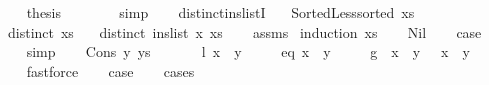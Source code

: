\begin{isabellebody}
\ \ \ \ \isamarkupfalse%
\ {\isacharquery}{\kern0pt}thesis\isanewline
\ \ \ \ \ \ \isamarkupfalse%
\ simp\isanewline
\ \ \isamarkupfalse%
\isanewline
{}\isamarkupfalse%
%
\endisatagproof
{\isafoldproof}%
%
\isadelimproof
\isanewline
%
\endisadelimproof
%
\isadeliminvisible
\isanewline
%
\endisadeliminvisible
%
\isataginvisible
{}\isamarkupfalse%
\ distinct{\isacharunderscore}{\kern0pt}ins{\isacharunderscore}{\kern0pt}listI{\isacharcolon}{\kern0pt}\isanewline
\ \ \ {\isachardoublequoteopen}Sorted{\isacharunderscore}{\kern0pt}Less{\isachardot}{\kern0pt}sorted\ xs{\isachardoublequoteclose}\isanewline
\ \ \ {\isachardoublequoteopen}distinct\ xs{\isachardoublequoteclose}\isanewline
\ \ \ {\isachardoublequoteopen}distinct\ {\isacharparenleft}{\kern0pt}ins{\isacharunderscore}{\kern0pt}list\ x\ xs{\isacharparenright}{\kern0pt}{\isachardoublequoteclose}%
\endisataginvisible
{\isafoldinvisible}%
%
\isadeliminvisible
\isanewline
%
\endisadeliminvisible
%
\isadelimproof
\ \ %
\endisadelimproof
%
\isatagproof
{}\isamarkupfalse%
\ assms\isanewline
{}\isamarkupfalse%
\ {\isacharparenleft}{\kern0pt}induction\ xs{\isacharparenright}{\kern0pt}\isanewline
\ \ \isamarkupfalse%
\ Nil\isanewline
\ \ \isamarkupfalse%
\ {\isacharquery}{\kern0pt}case\isanewline
\ \ \ \ \isamarkupfalse%
\ simp\isanewline
{}\isamarkupfalse%
\isanewline
\ \ \isamarkupfalse%
\ {\isacharparenleft}{\kern0pt}Cons\ y\ ys{\isacharparenright}{\kern0pt}\isanewline
\ \ \isamarkupfalse%
\isanewline
\ \ \ \ {\isacharparenleft}{\kern0pt}l{\isacharparenright}{\kern0pt}\ {\isachardoublequoteopen}x\ {\isacharless}{\kern0pt}\ y{\isachardoublequoteclose}\ {\isacharbar}{\kern0pt}\isanewline
\ \ \ \ {\isacharparenleft}{\kern0pt}eq{\isacharparenright}{\kern0pt}\ {\isachardoublequoteopen}x\ {\isacharequal}{\kern0pt}\ y{\isachardoublequoteclose}\ {\isacharbar}{\kern0pt}\isanewline
\ \ \ \ {\isacharparenleft}{\kern0pt}g{\isacharparenright}{\kern0pt}\ {\isachardoublequoteopen}{\isasymnot}\ x\ {\isacharless}{\kern0pt}\ y\ {\isasymand}\ {\isasymnot}\ x\ {\isacharequal}{\kern0pt}\ y{\isachardoublequoteclose}\isanewline
\ \ \ \ \isamarkupfalse%
\ fastforce\isanewline
\ \ \isamarkupfalse%
\ {\isacharquery}{\kern0pt}case\isanewline
\ \ \isamarkupfalse%
\ {\isacharparenleft}{\kern0pt}cases{\isacharparenright}{\kern0pt}\isanewline

\end{isabellebody}

